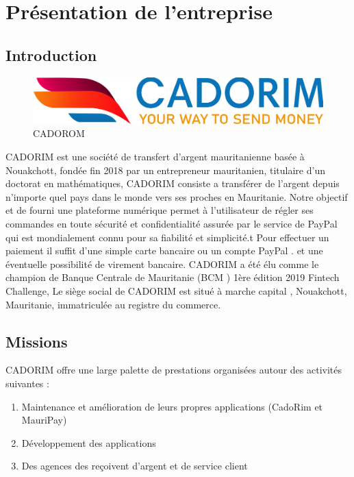 \chapter{Présentation de l’entreprise}
\label{chap:introduction}
\section{Introduction}
\begin{figure}[h]
	\includegraphics[scale=0.14]{./Template LaTeX/Images/cado_logo.png}
	\centering
	\caption{CADOROM}
\end{figure}
CADORIM est une société de transfert d’argent mauritanienne basée à Nouakchott,
fondée fin 2018 par un entrepreneur mauritanien, titulaire d'un doctorat en
mathématiques,
CADORIM consiste a transférer de l’argent depuis n’importe quel pays dans le
monde vers ses proches en Mauritanie. Notre objectif et de fourni une plateforme
numérique permet à l’utilisateur de régler ses commandes en toute sécurité et
confidentialité assurée par le service de PayPal qui est mondialement connu pour sa
fiabilité et simplicité.t Pour effectuer un paiement il suffit d'une simple carte bancaire
ou un compte PayPal . et une éventuelle possibilité de virement bancaire.
CADORIM a été élu comme le champion de Banque Centrale de Mauritanie (BCM )
1ère édition 2019 Fintech Challenge,
Le siège social de CADORIM est situé à marche capital , Nouakchott, Mauritanie,
immatriculée au registre du commerce.
\section{Missions}
CADORIM offre une large palette de prestations organisées autour des activités suivantes :
\begin{enumerate}
	
	\item Maintenance et amélioration de leurs propres applications (CadoRim et MauriPay)
	\item Développement des applications 
	\item Des agences des reçoivent d'argent et de service client
	
\end{enumerate}
